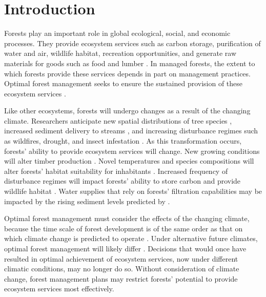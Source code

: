 
\section{Introduction}
 
Forests play an important role in global ecological, social, and economic processes. They provide ecosystem services such as carbon storage, purification of water and air, wildlife habitat, recreation opportunities, and generate raw materials for goods such as food and lumber \cite{daily1997ecosystem}. In managed forests, the extent to which forests provide these services depends in part on management practices. Optimal forest management seeks to ensure the sustained provision of these ecosystem services \cite{cfrForestMgmt}.

Like other ecosystems, forests will undergo changes as a result of the changing climate. Researchers anticipate new spatial distributions of tree species \cite{iverson1998predicting}, increased sediment delivery to streams \cite{Goode20121}, and increasing disturbance regimes such as wildfires, drought, and insect infestation \cite{vose2012effects}. As this transformation occurs, forests' ability to provide ecosystem services will change. New growing conditions will alter timber production \cite{forschungsanstalten2009adaptation}. Novel temperatures and species compositions will alter forests' habitat suitability for inhabitants \cite{harding1997ecosystem}. Increased frequency of disturbance regimes will impact forests' ability to store carbon \cite{bonan2008forests} and provide wildlife habitat \cite{mckenzie2004climatic}. Water supplies that rely on forests' filtration capabilities may be impacted by the rising sediment levels predicted by \cite{Goode20121}.

Optimal forest management must consider the effects of the changing climate, because the time scale of forest development is of the same order as that on which climate change is predicted to operate \cite{ipcc2013climate}. Under alternative future climates, optimal forest management will likely differ \cite{linder2000developing}. Decisions that would once have resulted in optimal achievement of ecosystem services, now under different climatic conditions, may no longer do so. Without consideration of climate change, forest management plans may restrict forests' potential to provide ecosystem services most effectively.

